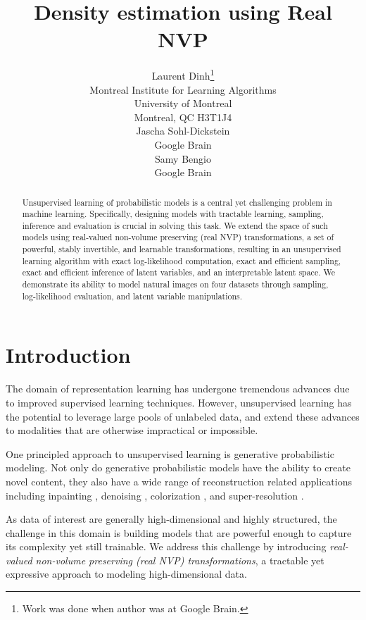 \documentclass{article}
\title{Density estimation using Real NVP}
\author{
  Laurent Dinh\thanks{Work was done when author was at Google Brain.} \\
  Montreal Institute for Learning Algorithms\\
  University of Montreal\\
  Montreal, QC H3T1J4\\
  \AND
  Jascha Sohl-Dickstein\\
  Google Brain \\
  \And
  Samy Bengio\\
  Google Brain \\
}
\newcommand{\jcom}[1]{\textcolor{darkgreen}{[jascha: #1]}}
\newcommand{\ldcom}[1]{\textcolor{blue}{[laurent: #1]}}
\begin{document}

\maketitle

\begin{abstract}
Unsupervised learning of probabilistic models is a central yet challenging problem in machine learning.
  Specifically, designing models with tractable learning, sampling,
  inference and evaluation is crucial in solving this task. We extend the space
  of such models using real-valued non-volume preserving (real NVP)
  transformations, a set of powerful, stably invertible, and learnable transformations,
  resulting in an unsupervised learning algorithm with exact log-likelihood computation,
  exact and efficient sampling, exact and efficient inference of latent variables,
  and an interpretable latent space. We
  demonstrate its ability to model natural images on four datasets through
  sampling, log-likelihood evaluation, and latent variable
  manipulations.
\end{abstract}
\section{Introduction}
The domain of representation learning has undergone tremendous advances due to improved supervised learning techniques. However, unsupervised learning has the potential to leverage large pools of unlabeled data, and extend these advances to modalities that are otherwise impractical or impossible.

One principled approach to unsupervised learning is generative probabilistic modeling. Not only do generative probabilistic models have the ability to create novel content, they also have a wide range of reconstruction related applications including inpainting \citep{theis2015generative, oord2016pixel, DBLP:conf/icml/Sohl-DicksteinW15}, denoising \citep{balle2015density}, colorization \citep{zhang2016colorful}, and super-resolution \citep{bruna2015super}.

As data of interest are generally high-dimensional and highly structured, the challenge in this domain is building models that are powerful enough to capture its complexity yet still trainable.
We address this challenge by introducing \emph{real-valued non-volume preserving (real NVP) transformations}, a tractable yet expressive approach to modeling high-dimensional data.
\end{document}
